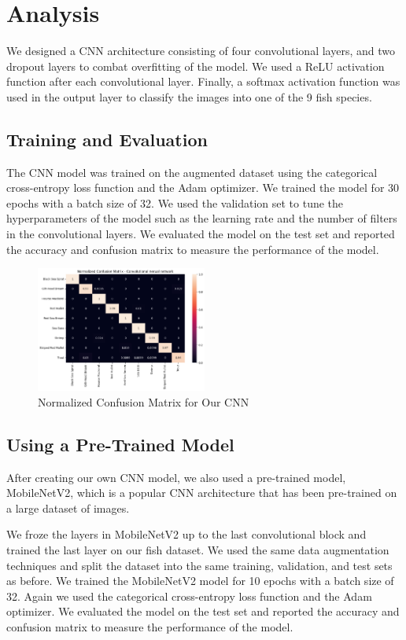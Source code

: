 \documentclass[a4paper, twocolumn]{article}
\begin{document}
\section{Analysis}\label{sec: Analysis}
We designed a CNN architecture consisting of four convolutional layers, and two dropout layers to combat overfitting of the model. We used a ReLU activation function after each convolutional layer. Finally, a softmax activation function was used in the output layer to classify the images into one of the 9 fish species.

\subsection{Training and Evaluation}\label{sec: Training and Evaluation}
The CNN model was trained on the augmented dataset using the categorical cross-entropy loss function and the Adam optimizer. We trained the model for 30 epochs with a batch size of 32. We used the validation set to tune the hyperparameters of the model such as the learning rate and the number of filters in the convolutional layers. We evaluated the model on the test set and reported the accuracy and confusion matrix to measure the performance of the model.

\begin{figure}[h]
\centering
\includegraphics[width=0.5\textwidth]{figures/confusion_matrix_CCN.png}
\caption{Normalized Confusion Matrix for Our CNN}
\label{fig:example}
\end{figure}

\subsection{Using a Pre-Trained Model}\label{sec: Using a Pre-Trained Model}
After creating our own CNN model, we also used a pre-trained model, MobileNetV2, which is a popular CNN architecture that has been pre-trained on a large dataset of images.
\cite{9422058}

We froze the layers in MobileNetV2 up to the last convolutional block and trained the last layer on our fish dataset. We used the same data augmentation techniques and split the dataset into the same training, validation, and test sets as before. We trained the MobileNetV2 model for 10 epochs with a batch size of 32. Again we used the categorical cross-entropy loss function and the Adam optimizer. We evaluated the model on the test set and reported the accuracy and confusion matrix to measure the performance of the model.
\end{document}
